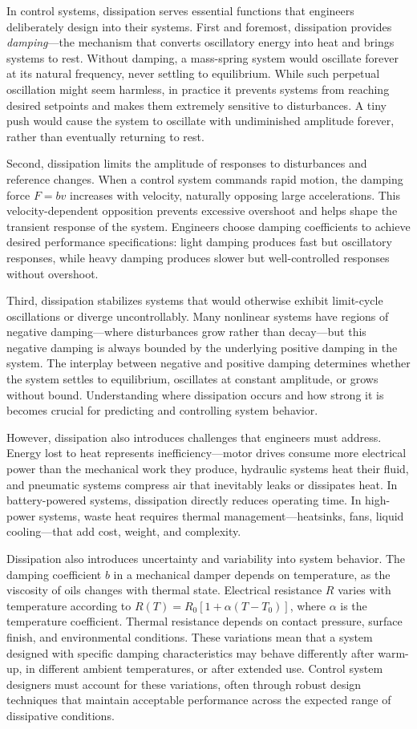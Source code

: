 In control systems, dissipation serves essential functions that engineers deliberately design into their systems. First and foremost, dissipation provides \emph{damping}—the mechanism that converts oscillatory energy into heat and brings systems to rest. Without damping, a mass-spring system would oscillate forever at its natural frequency, never settling to equilibrium. While such perpetual oscillation might seem harmless, in practice it prevents systems from reaching desired setpoints and makes them extremely sensitive to disturbances. A tiny push would cause the system to oscillate with undiminished amplitude forever, rather than eventually returning to rest.

Second, dissipation limits the amplitude of responses to disturbances and reference changes. When a control system commands rapid motion, the damping force $F = b v$ increases with velocity, naturally opposing large accelerations. This velocity-dependent opposition prevents excessive overshoot and helps shape the transient response of the system. Engineers choose damping coefficients to achieve desired performance specifications: light damping produces fast but oscillatory responses, while heavy damping produces slower but well-controlled responses without overshoot.

Third, dissipation stabilizes systems that would otherwise exhibit limit-cycle oscillations or diverge uncontrollably. Many nonlinear systems have regions of negative damping—where disturbances grow rather than decay—but this negative damping is always bounded by the underlying positive damping in the system. The interplay between negative and positive damping determines whether the system settles to equilibrium, oscillates at constant amplitude, or grows without bound. Understanding where dissipation occurs and how strong it is becomes crucial for predicting and controlling system behavior.

However, dissipation also introduces challenges that engineers must address. Energy lost to heat represents inefficiency—motor drives consume more electrical power than the mechanical work they produce, hydraulic systems heat their fluid, and pneumatic systems compress air that inevitably leaks or dissipates heat. In battery-powered systems, dissipation directly reduces operating time. In high-power systems, waste heat requires thermal management—heatsinks, fans, liquid cooling—that add cost, weight, and complexity.

Dissipation also introduces uncertainty and variability into system behavior. The damping coefficient $b$ in a mechanical damper depends on temperature, as the viscosity of oils changes with thermal state. Electrical resistance $R$ varies with temperature according to $R(T) = R_0[1 + \alpha(T - T_0)]$, where $\alpha$ is the temperature coefficient. Thermal resistance depends on contact pressure, surface finish, and environmental conditions. These variations mean that a system designed with specific damping characteristics may behave differently after warm-up, in different ambient temperatures, or after extended use. Control system designers must account for these variations, often through robust design techniques that maintain acceptable performance across the expected range of dissipative conditions.


